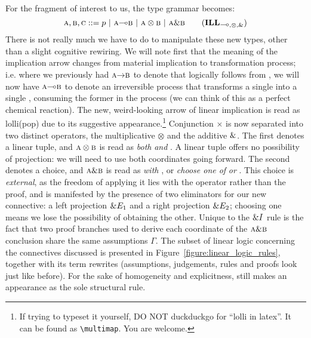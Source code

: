 For the fragment of interest to us, the type grammar becomes:
\begin{equation}
\prop{A}, \prop{B}, \prop{C} ::= p \ | \ \prop{A} \li \prop{B} \ | \ \prop{A} \otimes \prop{B} \ | \ \prop{A} \with \prop{B} 
\tag{$\ILL_{\li, \otimes, \with}$}
\label{grammar:ILL}
\end{equation}
There is not really much we have to do to manipulate these new types, other than a slight cognitive rewiring.
We will note first that the meaning of the implication arrow changes from material implication to transformation process; i.e. where we previously had $\smallprop{A} \ii \smallprop{B}$ to denote that  logically follows from , we will now have $\smallprop{A} \li \smallprop{B}$ to denote an irreversible process that transforms a single  into a single , consuming the former in the process (we can think of this as a perfect chemical reaction).
The new, weird-looking arrow of linear implication is read as lolli(pop) due to its suggestive appearance.\footnote{If trying to typeset it yourself, DO NOT duckduckgo for ``lolli in latex''. It can be found as \texttt{\textbackslash multimap}. You are welcome.}
Conjunction $\times$ is now separated into two distinct operators, the multiplicative $\otimes$ and the additive ${\&}$. 
The first denotes a linear tuple, and $\smallprop{A} \otimes \smallprop{B}$ is read as \textit{both}  \textit{and} .
A linear tuple offers no possibility of projection: we will need to use both coordinates going forward.
The second denotes a choice, and $\smallprop{A} \with \smallprop{B}$ is read as  \textit{with} , or \textit{choose one of} \textit{or} .
This choice is \textit{external}, as the freedom of applying it lies with the operator rather than the proof, and is manifested by the presence of two eliminators for our new connective: a left projection ${\&} E_1$ and a right projection ${\&} E_2$; choosing one means we lose the possibility of obtaining the other.
Unique to the ${\&} I$ rule is the fact that two proof branches used to derive each coordinate of the $\smallprop{A} \with \smallprop{B}$ conclusion share the same assumptions $\Gamma$.
The subset of linear logic concerning the connectives discussed is presented in Figure~\ref{figure:linear_logic_rules}, together with its term rewrites (assumptions, judgements, rules and proofs look just like before).
For the sake of homogeneity and explicitness, \Exchange{} still makes an appearance as the sole structural rule.


